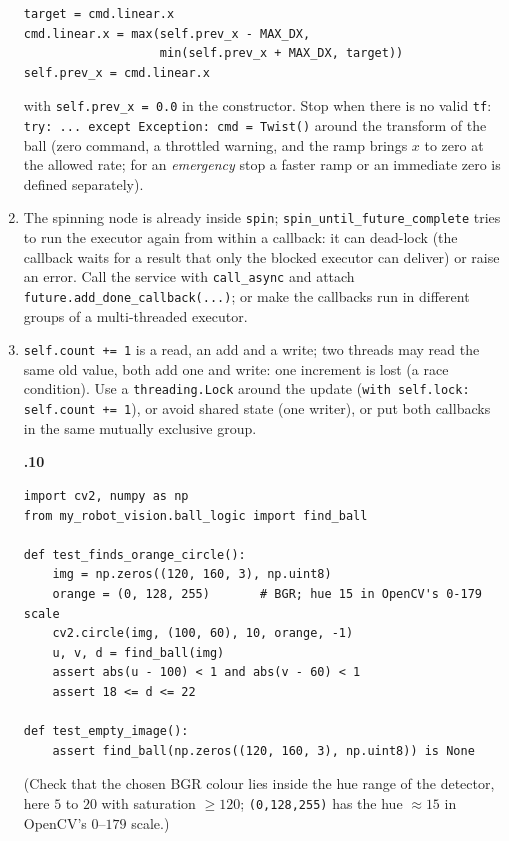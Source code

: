 \begin{enumerate}[label=\textbf{\ansnum.\arabic*}]
\begin{verbatim}
target = cmd.linear.x
cmd.linear.x = max(self.prev_x - MAX_DX,
                   min(self.prev_x + MAX_DX, target))
self.prev_x = cmd.linear.x
\end{verbatim}
  with \verb!self.prev_x = 0.0! in the constructor. Stop when there is no valid \verb!tf!: \verb!try: ... except Exception: cmd = Twist()! around the transform of the ball (zero command, a throttled warning, and the ramp brings $x$ to zero at the allowed rate; for an \emph{emergency} stop a faster ramp or an immediate zero is defined separately).
  \item The spinning node is already inside \verb!spin!; \verb!spin_until_future_complete! tries to run the executor again from within a callback: it can dead-lock (the callback waits for a result that only the blocked executor can deliver) or raise an error. Call the service with \verb!call_async! and attach \verb!future.add_done_callback(...)!; or make the callbacks run in different groups of a multi-threaded executor.
  \item \verb!self.count += 1! is a read, an add and a write; two threads may read the same old value, both add one and write: one increment is lost (a race condition). Use a \verb!threading.Lock! around the update (\verb!with self.lock: self.count += 1!), or avoid shared state (one writer), or put both callbacks in the same mutually exclusive group.
  \item[\textbf{\ansnum.10}]
\begin{verbatim}
import cv2, numpy as np
from my_robot_vision.ball_logic import find_ball

def test_finds_orange_circle():
    img = np.zeros((120, 160, 3), np.uint8)
    orange = (0, 128, 255)       # BGR; hue 15 in OpenCV's 0-179 scale
    cv2.circle(img, (100, 60), 10, orange, -1)
    u, v, d = find_ball(img)
    assert abs(u - 100) < 1 and abs(v - 60) < 1
    assert 18 <= d <= 22

def test_empty_image():
    assert find_ball(np.zeros((120, 160, 3), np.uint8)) is None
\end{verbatim}
  (Check that the chosen BGR colour lies inside the hue range of the detector, here $5$ to $20$ with saturation $\ge120$; \verb!(0,128,255)! has the hue $\approx15$ in OpenCV's $0$--$179$ scale.)
\end{enumerate}
